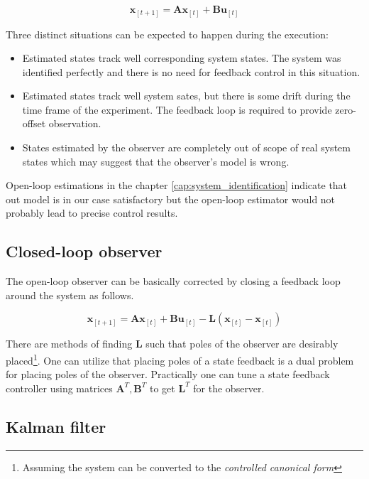 \begin{equation}
\textbf{\^x}_{[t+1]} = \textbf{A}\textbf{\^x}_{[t]} + \textbf{B}\textbf{u}_{[t]}
\label{eq:openloop_observer}
\end{equation}

Three distinct situations can be expected to happen during the execution:

\begin{itemize}
\item Estimated states track well corresponding system states. The system was identified perfectly and there is no need for feedback control in this situation.
\item Estimated states track well system sates, but there is some drift during the time frame of the experiment. The feedback loop is required to provide zero-offset observation.
\item States estimated by the observer are completely out of scope of real system states which may suggest that the observer's model is wrong.
\end{itemize}

Open-loop estimations in the chapter \ref{cap:system_identification} indicate that out model is in our case satisfactory but the open-loop estimator would not probably lead to precise control results.

\subsection{Closed-loop observer}

The open-loop observer can be basically corrected by closing a feedback loop around the system as follows.

\begin{equation}
\textbf{\^x}_{[t+1]} = \textbf{A}\textbf{\^x}_{[t]} + \textbf{B}\textbf{u}_{[t]} - \textbf{L}\left(\textbf{x}_{[t]} - \textbf{\^x}_{[t]}\right)
\label{eq:closed_loop_observer}
\end{equation}

There are methods of finding $\textbf{L}$ such that poles of the observer are desirably placed\footnote{Assuming the system can be converted to the \textit{controlled canonical form}}. One can utilize that placing poles of a state feedback is a dual problem for placing poles of the observer. Practically one can tune a state feedback controller using matrices $\textbf{A}^T, \textbf{B}^T$ to get $\textbf{L}^T$ for the observer.

\subsection{Kalman filter}

